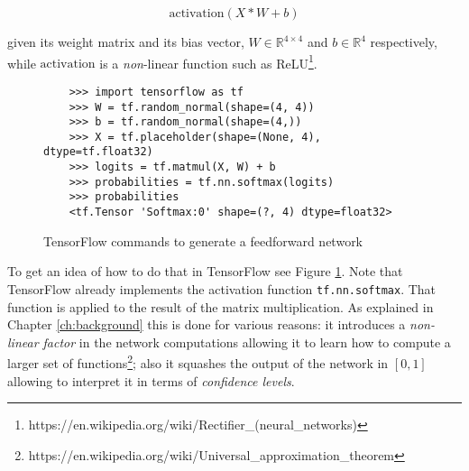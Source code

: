 \[ \text{activation}(X * W + b) \]

given its weight matrix and its bias vector, \( W \in \mathbb{R}^{4
  \times 4} \) and \( b \in \mathbb{R}^{4}\) respectively, while
\( \text{activation} \) is a \emph{non}-linear function such as
ReLU\footnote{https://en.wikipedia.org/wiki/Rectifier\_(neural\_networks)
}.

\begin{figure}
  \begin{verbatim}
    >>> import tensorflow as tf
    >>> W = tf.random_normal(shape=(4, 4))
    >>> b = tf.random_normal(shape=(4,))
    >>> X = tf.placeholder(shape=(None, 4), dtype=tf.float32)
    >>> logits = tf.matmul(X, W) + b
    >>> probabilities = tf.nn.softmax(logits)
    >>> probabilities
    <tf.Tensor 'Softmax:0' shape=(?, 4) dtype=float32>
  \end{verbatim}
  \caption{TensorFlow commands to generate a feedforward network}
  \label{fig:tensorflow-feedforward}
\end{figure}

To get an idea of how to do that in TensorFlow see Figure
\ref{fig:tensorflow-feedforward}. Note that TensorFlow already
implements the activation function \texttt{tf.nn.softmax}. That
function is applied to the result of the matrix multiplication. As
explained in Chapter \ref{ch:background} this is done for various
reasons: it introduces a \emph{non-linear factor} in the network
computations allowing it to learn how to compute a larger set of
functions\footnote{https://en.wikipedia.org/wiki/Universal\_approximation\_theorem};
also it squashes the output of the network in $[0,1]$ allowing to
interpret it in terms of \emph{confidence levels}.

